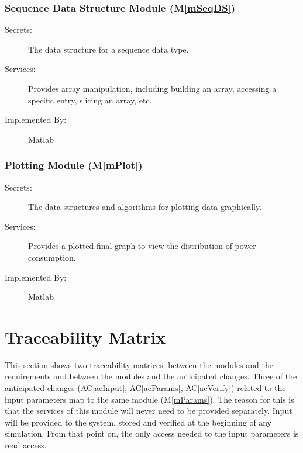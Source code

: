 \documentclass[12pt]{article}
\newcommand{\acref}[1]{AC\ref{#1}}
\newcommand{\mref}[1]{M\ref{#1}}
\begin{document}
\subsubsection{Sequence Data Structure Module (\mref{mSeqDS})}

\begin{description}
\item[Secrets:] The data structure for a sequence data type.
\item[Services:] Provides array manipulation, including building an array,
  accessing a specific entry, slicing an array, etc.
\item[Implemented By:] Matlab
\end{description}



\subsubsection{Plotting Module (\mref{mPlot})}

\begin{description}
\item[Secrets:] The data structures and algorithms for plotting data graphically.
\item[Services:] Provides a plotted final graph to view the distribution of power consumption.
\item[Implemented By:] Matlab
\end{description}

\section{Traceability Matrix} \label{SecTM}

This section shows two traceability matrices: between the modules and the
requirements and between the modules and the anticipated changes.  Three of the
anticipated changes (\acref{acInput}, \acref{acParams}, \acref{acVerify})
related to the input parameters map to the same module (\mref{mParams}).  The
reason for this is that the services of this module will never need to be
provided separately.  Input will be provided to the system, stored and verified
at the beginning of any simulation.  From that point on, the only access needed
to the input parameters is read access.
\end{document}
